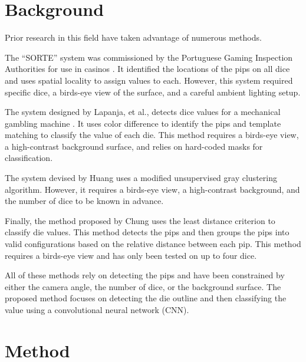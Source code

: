 \documentclass[conference]{IEEEtran}
\begin{document}
\section{Background}


Prior research in this field have taken advantage of numerous methods.

The ``SORTE'' system was commissioned by the Portuguese Gaming Inspection Authorities for use in casinos \cite{Correia1995}.
It identified the locations of the pips on all dice and uses spatial locality to assign values to each.
However, this system required specific dice, a birds-eye view of the surface, and a careful ambient lighting setup.

The system designed by Lapanja, et al., detects dice values for a mechanical gambling machine \cite{Lapanjaa}.
It uses color difference to identify the pips and template matching to classify the value of each die.
This method requires a birds-eye view, a high-contrast background surface, and relies on hard-coded masks for classification.

The system devised by Huang \cite{Huang2008} uses a modified unsupervised gray clustering algorithm. 
However, it requires a birds-eye view, a high-contrast background, and the number of dice to be known in advance.

Finally, the method proposed by Chung \cite{Chung2009} uses the least distance criterion to classify die values.
This method detects the pips and then groups the pips into valid configurations based on the relative distance between each pip.
This method requires a birds-eye view and has only been tested on up to four dice.

All of these methods rely on detecting the pips and have been constrained by either the camera angle, the number of dice, or the background surface.
The proposed method focuses on detecting the die outline and then classifying the value using a convolutional neural network (CNN).

\section{Method}
\end{document}
